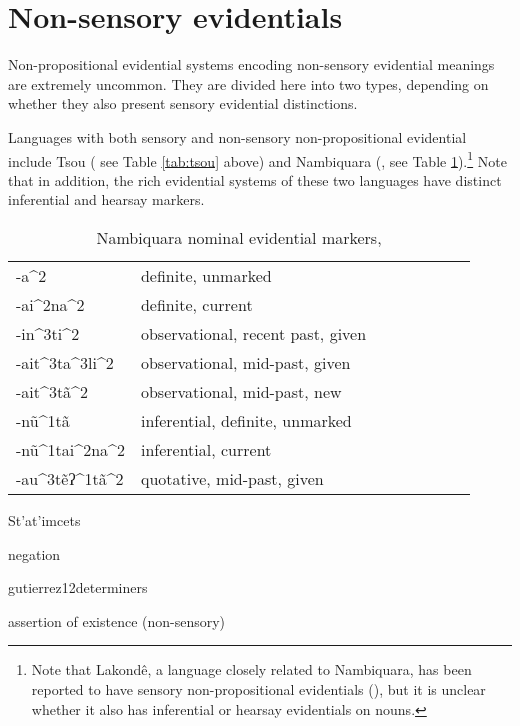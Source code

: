 \documentclass[oneside,a4paper,11pt]{article}
\newcommand{\ipa}[1]{{\phon \mbox{#1}}} %
\begin{document}
\section{Non-sensory evidentials} \label{sec:nonsens}
Non-propositional evidential systems encoding non-sensory evidential meanings are extremely uncommon. They are divided here into two types, depending on whether they also present sensory evidential distinctions.

Languages with  both sensory and non-sensory non-propositional evidential include Tsou (\citealt{yang00tsou.case} see Table \ref{tab:tsou} above) and Nambiquara (\citealt{lowe99nambiquara}, see Table \ref{tab:nambiquara}).\footnote{Note that Lakondê, a language closely related to Nambiquara, has been reported to have sensory non-propositional evidentials (\citealt[248-9]{wetzels06lakonde}), but it is unclear whether it also has inferential or hearsay evidentials on nouns.} Note that in addition, the rich evidential systems of these two languages have distinct inferential and hearsay markers. 


 \begin{table}[H]
 \caption{Nambiquara nominal evidential markers, \citet[282]{lowe99nambiquara} } \centering \label{tab:nambiquara}
\begin{tabular}{llllllll}
\toprule
\ipa{-a^2} & definite, unmarked \\
\ipa{-ai^2na^2} & definite, current \\
\ipa{-in^3ti^2} & observational, recent past, given \\
\ipa{-ait^3ta^3li^2} & observational, mid-past, given \\
\ipa{-ait^3tã^2} & observational, mid-past, new \\
\ipa{-nũ^1tã} & inferential, definite, unmarked \\
\ipa{-nũ^1tai^2na^2} & inferential, current \\
\ipa{-au^3tẽʔ^1tã^2} & quotative, mid-past, given \\
\bottomrule
\end{tabular}
\end{table}


 
 
 
 

St'at'imcets

 negation
  
   \citet[193]{eijk97lillooet}
  \ipa{gutierrez12determiners}
  
  assertion of existence (non-sensory)
\end{document}
